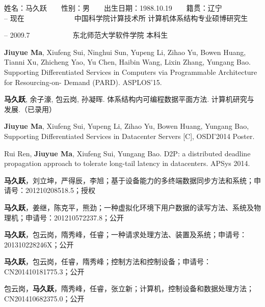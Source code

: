 \begin{resume}

\noindent
姓名：马久跃　　性别：男　　出生日期：1988.10.19　　籍贯：辽宁\\

 -- 现在　　　　　　　中国科学院计算技术所 计算机体系结构专业硕博研究生

 -- 2009.7　　　　　　东北师范大学软件学院 本科生\\

  \begin{enumerate}[leftmargin=1.5\parindent, nolistsep, label={[\arabic*]}]
    \item \textbf{Jiuyue Ma}, Xiufeng Sui, Ninghui Sun, Yupeng Li, Zihao Yu, Bowen Huang, Tianni Xu, Zhicheng Yao, Yu Chen, Haibin Wang, Lixin Zhang, Yungang Bao.
          Supporting Differentiated Services in Computers via Programmable Architecture for Resourcing-on- Demand (PARD). ASPLOS'15.
    \item \textbf{马久跃}, 余子濠, 包云岗, 孙凝晖. 体系结构内可编程数据平面方法. 计算机研究与发展.（已录用）
    \item \textbf{Jiuyue Ma}, Xiufeng Sui, Yupeng Li, Zihao Yu, Bowen Huang, Yungang Bao, Supporting Differentiated Services in Datacenter Servers [C], OSDI'2014 Poster.
    \item Rui Ren, \textbf{Jiuyue Ma}, Xiufeng Sui, Yungang Bao. D2P: a distributed deadline propagation approach to tolerate long-tail latency in datacenters. APSys 2014.
  \end{enumerate}

  \begin{enumerate}[leftmargin=1.5\parindent, nolistsep, label={[\arabic*]}]
    \item \textbf{马久跃}，刘立坤，严得辰，李旭；基于设备能力的多终端数据同步方法和系统；申请号：201210208518.5；授权
    \item \textbf{马久跃}，姜继，陈克平，熊劲；一种虚拟化环境下用户数据的读写方法、系统及物理机；申请号：201210572237.8；公开
    \item \textbf{马久跃}，包云岗，隋秀峰，任睿；一种请求处理方法、装置及系统；申请号：201310228246X；公开
    \item \textbf{马久跃}，包云岗，任睿，隋秀峰；控制方法和控制设备；申请号：CN201410181775.3；公开
    \item 包云岗，\textbf{马久跃}，隋秀峰，任睿，张立新；计算机，控制设备和数据处理方法；CN201410682375.0；公开
  \end{enumerate}


\end{resume}
